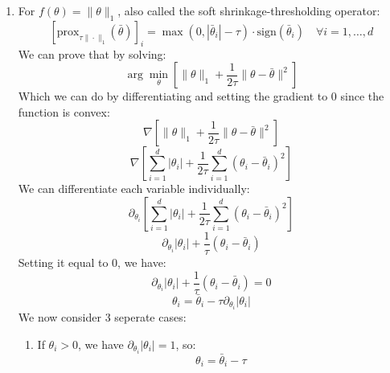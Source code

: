 \documentclass[12pt]{article}
\begin{document}
\begin{enumerate}[label = \letters]
    So we want to minimize the distance between
    $\theta$ and $\bar{\theta}$
    such that $\theta$ is in the unit circle. \\
    Now, if $\bar{\theta}$
    is also in the unit circle,
    we can just set $\theta = \bar{\theta}$. \\
    If it is not, the closest point in
    the unit circle to $\bar{\theta}$
    will be the projction of $\bar{\theta}$
    on the unit cirlce, that is:
    \[ \dfrac{\bar{\theta}}{\|\bar{\theta}\|_2} \]
    which is just $\bar{\theta}$ normalized,
    the point in the direction of $\bar{\theta}$
    on the unit circle. \\
    So:
    \[ \theta = \piecewise{
        \bar{\theta} \qquad \qquad 
        \IF \|\bar{\theta}\|_2 \leq 1
        \\  \dfrac{\bar{\theta}}{\|\bar{\theta}\|_2} 
        \qquad \; \IF \|\bar{\theta}\|_2 > 1
    } \]
    Which is precisely:
    \[ \theta = \frac{\bar{\theta}}
    {\max(1, \|\bar{\theta}\|_2)} \]
\item For $f(\theta) = \|\theta\|_1$,
    also called the soft shrinkage-thresholding 
    operator:
    \[ \left[ \text{prox}_{\tau \|\cdot\|_1}
    (\bar{\theta}) \right]_i = 
    \max(0, |\bar{\theta}_i| - \tau) \cdot 
    \text{sign}(\bar{\theta}_i) 
    \quad \forall i = 1, \ldots, d \]
    We can prove that by solving:
    \[ \arg\min_{\theta} \left[ \|\theta\|_1 + 
    \frac{1}{2\tau} \|\theta - \bar{\theta}\|^2 \right] \]
    Which we can do by differentiating and setting
    the gradient to $0$ since the function
    is convex:
    \[ \nabla \left[ \|\theta\|_1 + 
    \frac{1}{2\tau} \|\theta - \bar{\theta}\|^2 \right] \]
    \[ \nabla \left[ \sum_{i=1}^d |\theta_i| + 
    \frac{1}{2\tau} \sum_{i=1}^d (\theta_i
    - \bar{\theta}_i)^2 \right] \]
    We can differentiate each variable individually:
    \[ \partial_{\theta_i}
    \left[ \sum_{i=1}^d |\theta_i| + 
    \frac{1}{2\tau} \sum_{i=1}^d (\theta_i
    - \bar{\theta}_i)^2 \right] \]
    \[ \partial_{\theta_i} |\theta_i| + 
    \frac{1}{\tau}(\theta_i - \bar{\theta}_i) \]
    Setting it equal to $0$, we have:
    \[ \partial_{\theta_i} |\theta_i| + 
    \frac{1}{\tau}(\theta_i - \bar{\theta}_i) = 0 \]
    \[ \theta_i = \bar{\theta}_i 
    - \tau\partial_{\theta_i} |\theta_i| \]
    We now consider $3$ seperate cases: 
    \begin{enumerate}[label = \numbers]
        \item 
        If $\theta_i > 0$,
        we have $\partial_{\theta_i} |\theta_i| = 1$, so:
        \[ \theta_i = \bar{\theta}_i - \tau \]

\end{enumerate}
\end{enumerate}
\end{document}
